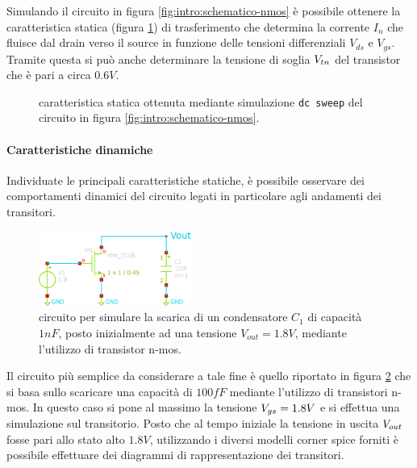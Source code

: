 		Simulando il circuito in figura \ref{fig:intro:schematico-nmos} è possibile ottenere la caratteristica statica (figura \ref{fig:intro:nmos-carattstatica}) di trasferimento che determina la corrente $I_n$ che fluisce dal drain verso il source in funzione delle tensioni differenziali $V_{ds}$ e $V_{gs}$. Tramite questa si può anche determinare la tensione di soglia $V_{tn}$ del transistor che è pari a circa $0.6V$.
		
		\begin{figure}[h!]
			\centering
			
			\caption{caratteristica statica ottenuta mediante simulazione \texttt{dc sweep} del circuito in figura \ref{fig:intro:schematico-nmos}.}
			\label{fig:intro:nmos-carattstatica}
		\end{figure}
		
	
		\paragraph{Caratteristiche dinamiche} Individuate le principali caratteristiche statiche, è possibile osservare dei comportamenti dinamici del circuito legati in particolare agli andamenti dei transitori.
	
		
		\begin{figure}[bht]
			\centering
			\includegraphics[width=5cm]{Immagini/circuito_transitorio.eps}
			\caption{circuito per simulare la scarica di un condensatore $C_1$ di capacità $1nF$, posto inizialmente ad una tensione $V_{out} = 1.8V$, mediante l'utilizzo di transistor n-mos.} \label{fig:intro:schematico-transitorio}
		\end{figure}
	
		Il circuito più semplice da considerare a tale fine è quello riportato in figura \ref{fig:intro:schematico-transitorio} che si basa sullo scaricare una capacità di $100fF$ mediante l'utilizzo di transistori n-mos. In questo caso si pone al massimo la tensione $V_{gs} = 1.8V$ e si effettua una simulazione sul transitorio. Posto che al tempo iniziale la tensione in uscita $V_{out}$ fosse pari allo stato alto $1.8V$, utilizzando i diversi modelli corner spice forniti è possibile effettuare dei diagrammi di rappresentazione dei transitori.
	
